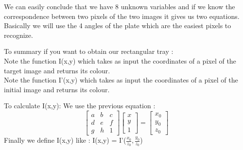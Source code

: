 \documentclass{article}
\begin{document}
We can easily conclude that we have 8 unknown variables and if we know the correspondence between two pixels of the two images it gives us two equations. Basically we will use the 4 angles of the plate which are the easiest pixels to recognize.

To summary if you want to obtain our rectangular tray :\\
Note the function I(x,y) which takes as input the coordinates of a pixel of the target image and returns its colour. \\
Note the function I\textquoteright(x,y) which takes as input the coordinates of a pixel of the initial image and returns its colour.
\vspace{ 1 cm}

To calculate I(x,y):
We use the previous equation :
$$\begin{bmatrix} a & b & c \\ d & e & f \\ g & h & 1 \end{bmatrix} \begin{bmatrix} x \\ y \\ 1 \end{bmatrix}  = \begin{bmatrix} x_0 \\ y_0 \\ z_0 \end{bmatrix}$$
Finally we define I(x,y) like : I(x,y) = I\textquoteright($\frac{x_0}{z_0}, \frac{y_0}{z_0}$)
\vspace{1 cm}
\end{document}
